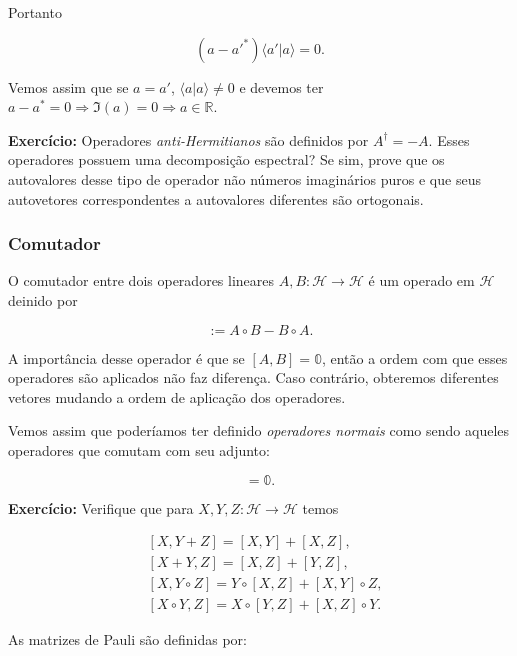 \documentclass[11pt]{article}
\begin{document}
Portanto

\begin{equation}
(a-a'^{*})\langle a'|a\rangle=0.
\end{equation}

Vemos assim que se \(a=a'\), \(\langle a|a\rangle\ne 0\) e devemos ter
\(a-a^{*}=0\Rightarrow \Im(a)=0\Rightarrow a\in\mathbb{R}\).

\textbf{Exercício:} Operadores \emph{anti-Hermitianos} são definidos por
\(A^{\dagger}=-A\). Esses operadores possuem uma decomposição espectral?
Se sim, prove que os autovalores desse tipo de operador não números
imaginários puros e que seus autovetores correspondentes a autovalores
diferentes são ortogonais.

    \subsubsection{Comutador}\label{comutador}

O comutador entre dois operadores lineares
\(A,B:\mathcal{H}\rightarrow\mathcal{H}\) é um operado em
\(\mathcal{H}\) deinido por

\begin{equation}
[A,B] := A\circ B - B\circ A.
\end{equation}

A importância desse operador é que se \([A,B]=\mathbb{0}\), então a
ordem com que esses operadores são aplicados não faz diferença. Caso
contrário, obteremos diferentes vetores mudando a ordem de aplicação dos
operadores.

Vemos assim que poderíamos ter definido \emph{operadores normais} como
sendo aqueles operadores que comutam com seu adjunto:

\begin{equation}
[A,A^{\dagger}] = \mathbb{0}.
\end{equation}

\textbf{Exercício:} Verifique que para
\(X,Y,Z:\mathcal{H}\rightarrow\mathcal{H}\) temos

\begin{align}
& [X,Y+Z] = [X,Y]+[X,Z], \\
& [X+Y,Z] = [X,Z]+[Y,Z], \\
& [X,Y\circ Z] = Y\circ[X,Z]+[X,Y]\circ Z, \\
& [X\circ Y,Z] = X\circ[Y,Z] + [X,Z]\circ Y.
\end{align}

As matrizes de Pauli são definidas por:
\end{document}
